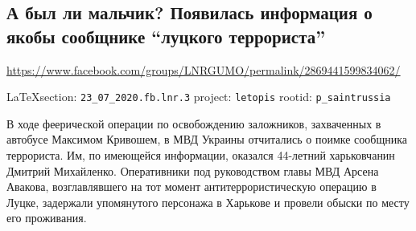  
 
\subsection{А был ли мальчик? Появилась информация о якобы сообщнике ``луцкого террориста''}
\label{sec:23_07_2020.fb.lnr.3}
\url{https://www.facebook.com/groups/LNRGUMO/permalink/2869441599834062/}

\vspace{0.5cm}
{\small\LaTeX section: \verb|23_07_2020.fb.lnr.3| project: \verb|letopis| rootid: \verb|p_saintrussia|}
\vspace{0.5cm}

В ходе феерической операции по освобождению заложников, захваченных в автобусе
Максимом Кривошем, в МВД Украины отчитались о поимке сообщника террориста. Им,
по имеющейся информации, оказался 44-летний харьковчанин Дмитрий Михайленко.
Оперативники под руководством главы МВД Арсена Авакова, возглавлявшего на тот
момент антитеррористическую операцию в Луцке, задержали упомянутого персонажа в
Харькове и провели обыски по месту его проживания. 
